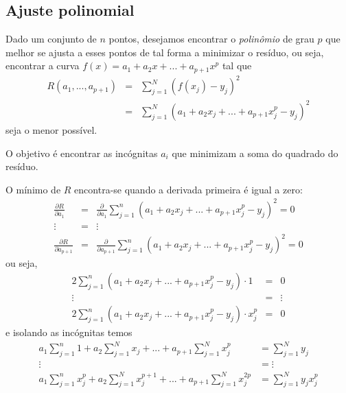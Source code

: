 \subsection{Ajuste polinomial}

Dado um conjunto de $n$ pontos, desejamos encontrar o \textit{polinômio} de grau $p$ que melhor se ajusta a esses pontos de tal forma a minimizar o resíduo, ou seja, encontrar a curva $f(x)=a_1+a_2 x+...+a_{p+1}x^{p}$ tal que 
\begin{eqnarray*}
  R(a_1,...,a_{p+1}) &=&\sum_{j=1}^N (f(x_j)-y_j)^2 \\
                 &=&\sum_{j=1}^N (a_1 + a_2 x_j+...+a_{p+1}x_j^p-y_j)^2
\end{eqnarray*}
seja o menor possível.

O objetivo é encontrar as incógnitas $a_i$ que minimizam a soma do quadrado do resíduo.

O mínimo de $R$ encontra-se quando a derivada primeira é igual a zero:
\begin{eqnarray*}
  \frac{\partial R}{\partial a_1}     &=& \frac{\partial }{\partial a_1}     \sum_{j=1}^n (a_1 + a_2 x_j+...+a_{p+1}x_j^p-y_j)^2 =0 \\
  \vdots &=& \vdots \\
  \frac{\partial R}{\partial a_{p+1}} &=& \frac{\partial }{\partial a_{p+1}} \sum_{j=1}^n (a_1 + a_2 x_j+...+a_{p+1}x_j^p-y_j)^2 =0 
\end{eqnarray*}
ou seja,
\begin{eqnarray*}
   2 \sum_{j=1}^n (a_1 + a_2 x_j+...+a_{p+1}x_j^p-y_j)\cdot 1    &=&0 \\
  \vdots &=& \vdots \\
   2 \sum_{j=1}^n (a_1 + a_2 x_j+...+a_{p+1}x_j^p-y_j)\cdot x_j^p&=&0 
\end{eqnarray*}
e isolando as incógnitas temos
\begin{eqnarray*}
   a_1\sum_{j=1}^n 1     + a_2 \sum_{j=1}^Nx_j      +...+a_{p+1} \sum_{j=1}^Nx_j^{p} &=\sum_{j=1}^N y_j\\
  \vdots &= \vdots \\
   a_1\sum_{j=1}^n x_j^p + a_2 \sum_{j=1}^Nx_j^{p+1}+...+a_{p+1} \sum_{j=1}^Nx_j^{2p} &=\sum_{j=1}^N y_jx_j^{p}
\end{eqnarray*}

